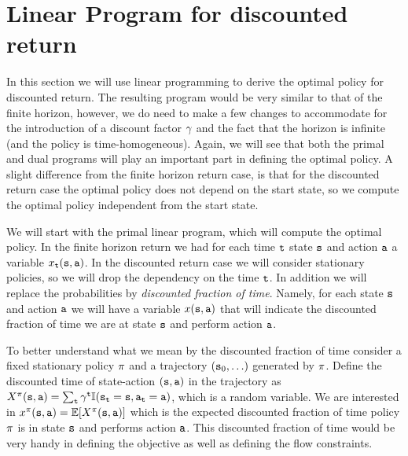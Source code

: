 \section{Linear Program for discounted return}
\label{chapter-discount:section:LP}

In this section we will use linear programming to derive the optimal
policy for discounted return.
%
The resulting program would be very similar to that of the finite horizon, however, we do need to make a few changes to accommodate for the introduction of a discount factor $\gamma$ and the fact that the horizon is infinite (and the policy is time-homogeneous).
%
Again, we will see that both the primal and dual programs will play an important part in defining the optimal policy. 
A slight difference from the finite horizon return case, is that for the discounted return case the optimal policy does not depend on the start state, so we compute the optimal policy independent from the start state.

We will start with the primal linear program, which will compute the optimal policy. In the finite horizon return we had for each time ${\tt t}$  state ${\tt s}$ and action ${\tt a}$ a variable $x_{\tt t}({\tt s},{\tt a})$.
In the discounted return case we will consider stationary policies, so we will drop the dependency on the time ${\tt t}$. In addition we will replace the probabilities by \textit{discounted fraction of time}.
Namely, for each state ${\tt s}$ and action ${\tt a}$ we will have a variable $x({\tt s},{\tt a})$ that will indicate the discounted fraction of time we are at state ${\tt s}$ and perform action ${\tt a}$.

To better understand what we mean by the {discounted fraction of time} consider a fixed stationary policy $\pi$ and a trajectory $({\tt s}_0, \ldots )$ generated by $\pi$. Define the discounted time of state-action $({\tt s},{\tt a})$ in the trajectory as $X^\pi({\tt s},{\tt a})=\sum_{\tt t} \gamma^{\tt t}\mathbb{I}({\tt s}_{\tt t}={\tt s},{\tt a}_{\tt t}={\tt a})$, which is a random variable. We are interested in
$x^\pi({\tt s},{\tt a})=\mathbb{E}[X^\pi({\tt s},{\tt a})]$ which is the expected discounted fraction of time policy $\pi$ is in state ${\tt s}$ and performs action ${\tt a}$.
This discounted fraction of time would be very handy in defining the objective as well as defining the flow constraints.

